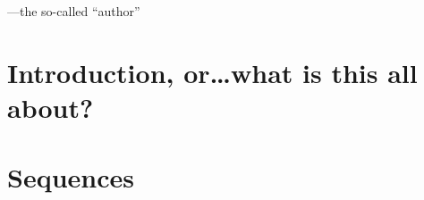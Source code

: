 \documentclass[justified]{tufte-book}
\begin{document}
\vspace{0.5in}
\hfill---the so-called ``author''

\mainmatter

\chapter*{Introduction, or\ldots what is this all about?}



\chapter{Sequences}
\label{chapter:sequences}





 
%



\end{document}
